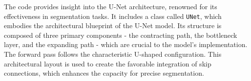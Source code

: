 The code provides insight into the U-Net architecture, renowned for its effectiveness in segmentation tasks. It includes a class called \texttt{UNet}, which embodies the architectural blueprint of the U-Net model. Its structure is composed of three primary components - the contracting path, the bottleneck layer, and the expanding path - which are crucial to the model's implementation. The forward pass follows the characteristic U-shaped configuration.  This architectural layout is used to create the favorable integration of skip connections, which enhances the capacity for precise segmentation.